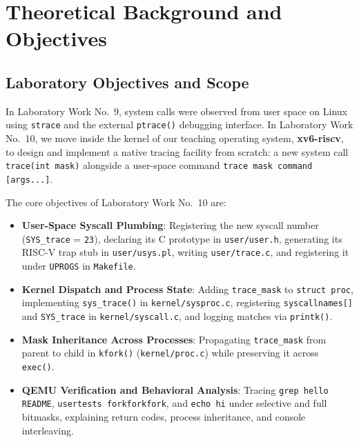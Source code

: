 \documentclass[12pt,a4paper]{article}
\begin{document}
\section{Theoretical Background and Objectives}

\subsection{Laboratory Objectives and Scope}
In Laboratory Work No.~9, system calls were observed from user space on Linux using \texttt{strace} and the external \texttt{ptrace()} debugging interface. In Laboratory Work No.~10, we move inside the kernel of our teaching operating system, \textbf{xv6-riscv}, to design and implement a native tracing facility from scratch: a new system call \texttt{trace(int mask)} alongside a user-space command \texttt{trace mask command [args...]}.

The core objectives of Laboratory Work No.~10 are:
\begin{itemize}
    \item \textbf{User-Space Syscall Plumbing}: Registering the new syscall number (\texttt{SYS\_trace} = \texttt{23}), declaring its C prototype in \texttt{user/\allowbreak user.h}, generating its RISC-V trap stub in \texttt{user/\allowbreak usys.pl}, writing \texttt{user/\allowbreak trace.c}, and registering it under \texttt{UPROGS} in \texttt{Makefile}.
    \item \textbf{Kernel Dispatch and Process State}: Adding \texttt{trace\_mask} to \texttt{struct proc}, implementing \texttt{sys\_trace()} in \texttt{kernel/\allowbreak sysproc.c}, registering \texttt{syscallnames[]} and \texttt{SYS\_trace} in \texttt{kernel/\allowbreak syscall.c}, and logging matches via \texttt{printk()}.
    \item \textbf{Mask Inheritance Across Processes}: Propagating \texttt{trace\_mask} from parent to child in \texttt{kfork()} (\texttt{kernel/proc.c}) while preserving it across \texttt{exec()}.
    \item \textbf{QEMU Verification and Behavioral Analysis}: Tracing \texttt{grep hello README}, \texttt{usertests forkforkfork}, and \texttt{echo hi} under selective and full bitmasks, explaining return codes, process inheritance, and console interleaving.
\end{itemize}
\end{document}
